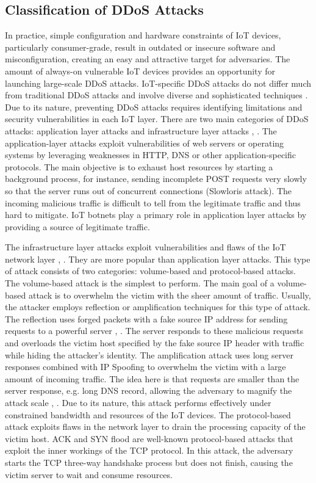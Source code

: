 \documentclass[conference, 11pt]{IEEEtran}
\begin{document}
    \subsection{Classification of DDoS Attacks}
    In practice, simple configuration and hardware constraints of IoT devices, particularly consumer-grade, result in outdated or insecure software and misconfiguration, creating an easy and attractive target for adversaries.
    The amount of always-on vulnerable IoT devices provides an opportunity for launching large-scale DDoS attacks.
    IoT-specific DDoS attacks do not differ much from traditional DDoS attacks and involve diverse and sophisticated techniques \cite{article:14}.
    Due to its nature, preventing DDoS attacks requires identifying limitations and security vulnerabilities in each IoT layer.
    There are two main categories of DDoS attacks: application layer attacks and infrastructure layer attacks \cite{article:14}, \cite{article:8}.
    The application-layer attacks exploit vulnerabilities of web servers or operating systems by leveraging weaknesses in HTTP, DNS or other application-specific protocols.
    The main objective is to exhaust host resources by starting a background process, for instance, sending incomplete POST requests very slowly so that the server runs out of concurrent connections (Slowloris attack).
    The incoming malicious traffic is difficult to tell from the legitimate traffic and thus hard to mitigate.
    IoT botnets play a primary role in application layer attacks by providing a source of legitimate traffic.

    The infrastructure layer attacks exploit vulnerabilities and flaws of the IoT network layer \cite{article:14}, \cite{article:8}.
    They are more popular than application layer attacks.
    This type of attack consists of two categories: volume-based and protocol-based attacks.
    The volume-based attack is the simplest to perform.
    The main goal of a volume-based attack is to overwhelm the victim with the sheer amount of traffic.
    Usually, the attacker employs reflection or amplification techniques for this type of attack.
    The reflection uses forged packets with a fake source IP address for sending requests to a powerful server \cite{article:14}, \cite{article:8}.
    The server responds to these malicious requests and overloads the victim host specified by the fake source IP header with traffic while hiding the attacker's identity.
    The amplification attack uses long server responses combined with IP Spoofing to overwhelm the victim with a large amount of incoming traffic.
    The idea here is that requests are smaller than the server response, e.g. long DNS record, allowing the adversary to magnify the attack scale \cite{article:14}, \cite{article:8}.
    Due to its nature, this attack performs effectively under constrained bandwidth and resources of the IoT devices.
    The protocol-based attack exploits flaws in the network layer to drain the processing capacity of the victim host.
    ACK and SYN flood are well-known protocol-based attacks that exploit the inner workings of the TCP protocol.
    In this attack, the adversary starts the TCP three-way handshake process but does not finish, causing the victim server to wait and consume resources.
\end{document}

